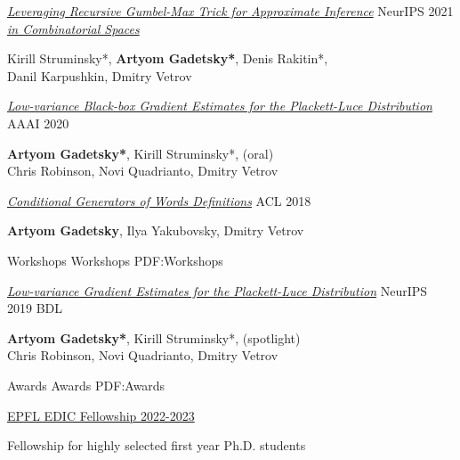 \documentclass[letterpaper,MMMyyyy,nonstopmode]{simpleresumecv}
\begin{document}
\begin{Body}
\Entry
\href{https://proceedings.neurips.cc/paper/2021/hash/5b658d2a925565f0755e035597f8d22f-Abstract.html}{\textit{Leveraging Recursive Gumbel-Max Trick for Approximate Inference}} \hfill NeurIPS 2021 \\ \href{https://proceedings.neurips.cc/paper/2021/hash/5b658d2a925565f0755e035597f8d22f-Abstract.html}{\textit{in Combinatorial Spaces}}
\begin{Detail}
Kirill Struminsky*, \textbf{Artyom Gadetsky*}, Denis Rakitin*, \\ Danil Karpushkin, Dmitry Vetrov
\end{Detail}
\Gap

\Entry
\href{https://ojs.aaai.org/index.php/AAAI/article/view/6572}{\textit{Low-variance Black-box Gradient Estimates for the Plackett-Luce Distribution}} \hfill AAAI 2020
\begin{Detail}
\textbf{Artyom Gadetsky*}, Kirill Struminsky*, \hfill(oral) \\ Chris Robinson, Novi Quadrianto, Dmitry Vetrov
\end{Detail}
\Gap

\Entry
\href{https://aclanthology.org/P18-2043/}{\textit{Conditional Generators of Words Definitions}} \hfill ACL 2018
\begin{Detail}
\textbf{Artyom Gadetsky}, Ilya Yakubovsky, Dmitry Vetrov
\end{Detail}
\BigGap

\SubSection
{Workshops}
{Workshops}
{PDF:Workshops}
\Gap

\Entry
\href{http://bayesiandeeplearning.org/2019/}{\textit{Low-variance Gradient Estimates for the Plackett-Luce Distribution}} \hfill NeurIPS 2019 BDL
\begin{Detail}
\textbf{Artyom Gadetsky*}, Kirill Struminsky*, \hfill (spotlight) \\ Chris Robinson, Novi Quadrianto, Dmitry Vetrov
\end{Detail}

\Section
{Awards}
{Awards}
{PDF:Awards}

\Entry
\href{https://www.epfl.ch/education/phd/edic-computer-and-communication-sciences/edic-for-phd-students/}{EPFL EDIC Fellowship 2022-2023}
\begin{Detail}
Fellowship for highly selected first year Ph.D. students
\end{Detail}
\Gap


\end{Body}
\end{document}
